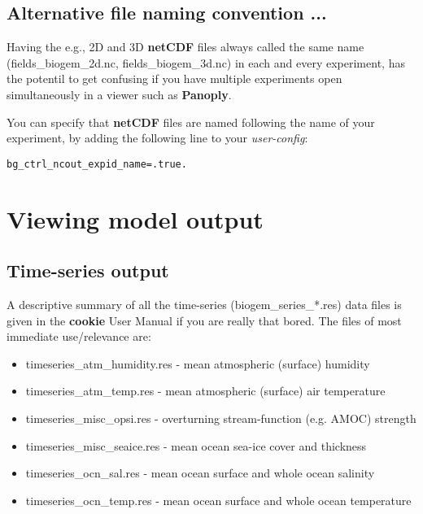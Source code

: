 \subsection*{Alternative file naming convention ...}

Having the e.g., 2D and 3D \textbf{netCDF} files always called the same name (\textsf{\footnotesize fields\_biogem\_2d.nc}, \textsf{\footnotesize fields\_biogem\_3d.nc}) in each and every experiment, has the potentil to get confusing if you have multiple experiments open simultaneously in a viewer such as \textbf{Panoply}.

You can specify that \textbf{netCDF} files are named following the name of your experiment, by adding the following line to your \textit{user-config}:

\vspace{-1mm}\begin{verbatim}
bg_ctrl_ncout_expid_name=.true.
\end{verbatim}

\newpage

\section{Viewing model output}


\subsection{Time-series output}

A descriptive summary of all the time-series (\textsf{\footnotesize biogem\_series\_*.res}) data files is given in the \textbf{cookie} User Manual if you are really that bored. The files of most immediate use/relevance are:

\vspace{1mm}
\begin{itemize}[noitemsep]
\setlength{\itemindent}{.2in}
\item \textsf{\footnotesize timeseries\_atm\_humidity.res}  - mean atmospheric (surface) humidity
\item \textsf{\footnotesize timeseries\_atm\_temp.res}      - mean atmospheric (surface) air temperature
\item \textsf{\footnotesize timeseries\_misc\_opsi.res}     - overturning stream-function (e.g. AMOC) strength
\item \textsf{\footnotesize timeseries\_misc\_seaice.res}   - mean ocean sea-ice cover and thickness
\item \textsf{\footnotesize timeseries\_ocn\_sal.res}       - mean ocean surface and whole ocean salinity
\item \textsf{\footnotesize timeseries\_ocn\_temp.res}      - mean ocean surface and whole ocean temperature
\end{itemize}

